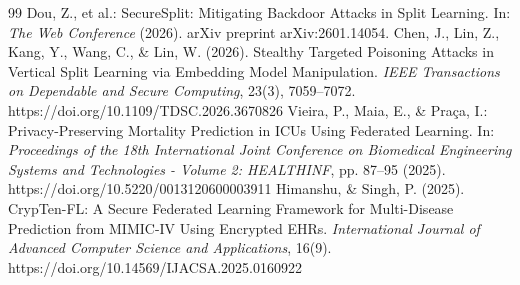 \documentclass[pdflatex,sn-mathphys-num]{sn-jnl}
\begin{document}
\begin{thebibliography}{99}
Dou, Z., et al.: SecureSplit: Mitigating Backdoor Attacks in Split Learning. In: \textit{The Web Conference} (2026). arXiv preprint arXiv:2601.14054.
Chen, J., Lin, Z., Kang, Y., Wang, C., \& Lin, W. (2026). Stealthy Targeted Poisoning Attacks in Vertical Split Learning via Embedding Model Manipulation. \textit{IEEE Transactions on Dependable and Secure Computing}, 23(3), 7059--7072. https://doi.org/10.1109/TDSC.2026.3670826
Vieira, P., Maia, E., \& Praça, I.: Privacy-Preserving Mortality Prediction in ICUs Using Federated Learning. In: \textit{Proceedings of the 18th International Joint Conference on Biomedical Engineering Systems and Technologies - Volume 2: HEALTHINF}, pp. 87--95 (2025). https://doi.org/10.5220/0013120600003911
Himanshu, \& Singh, P. (2025). CrypTen-FL: A Secure Federated Learning Framework for Multi-Disease Prediction from MIMIC-IV Using Encrypted EHRs. \textit{International Journal of Advanced Computer Science and Applications}, 16(9). https://doi.org/10.14569/IJACSA.2025.0160922
\end{thebibliography}
\end{document}
